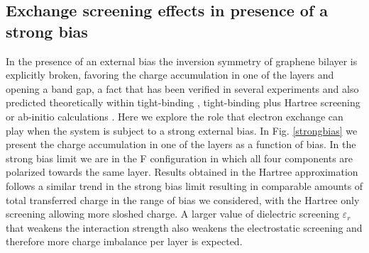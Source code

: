 \documentclass[twocolumn,prb,showpacs,preprintnumbers,amsmath,amssymb]{revtex4}
\begin{document}
\subsection{Exchange screening effects in presence of a strong bias}
In the presence of an external bias the inversion symmetry of graphene bilayer is explicitly broken,
favoring the charge accumulation in one of the layers and opening a band gap, a fact that has been
verified in several experiments \cite{ohta,delft, yuanbo} and also predicted theoretically within tight-binding
\cite{castro},
tight-binding plus Hartree screening \cite{mccann,zhangscr} or ab-initio calculations \cite{hongki}.
Here we explore the role that electron exchange can play when 
the system is subject to a strong external bias.
In Fig. \ref{strongbias} we present the charge accumulation in one of the layers as a function 
of bias. In the strong bias limit we are in the F 
configuration in which all four components are polarized towards the same layer. 
Results obtained in the Hartree approximation follows a similar trend in the strong bias limit resulting
in comparable amounts of total transferred charge in the range of bias we considered, 
with the Hartree only screening allowing more sloshed charge. 
A larger value of dielectric screening $\varepsilon_r$ that weakens the interaction strength
also weakens the electrostatic screening and therefore more charge imbalance per layer is expected. 
\end{document}
